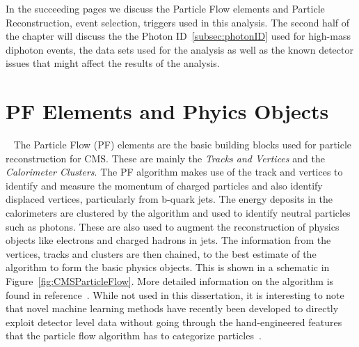 In the succeeding pages we discuss the Particle Flow elements and Particle Reconstruction, event selection, triggers used in this analysis. The second half of the chapter will discuss the the Photon ID~\ref{subsec:photonID} used for high-mass diphoton events, the data sets used for the analysis as well as the known detector issues that might affect the results of the analysis. 


\section{PF Elements and Phyics Objects}~\label{sec:PFelements}
The Particle Flow (PF) elements are the basic building blocks used for particle reconstruction for CMS. These are mainly the \textit{Tracks and Vertices} and the \textit{Calorimeter Clusters}. The PF algorithm makes use of the track and vertices to identify and measure the momentum of charged particles and also identify displaced vertices, particularly from b-quark jets. The energy deposits in the calorimeters are clustered by the algorithm and used to identify neutral particles such as photons. These are also used to augment the reconstruction of physics objects like electrons and charged hadrons in jets. The information from the vertices, tracks and clusters are then chained, to the best estimate of the algorithm to form the basic physics objects. This is shown in a schematic in Figure~\ref{fig:CMSParticleFlow}. More detailed information on the algorithm is found in reference~\cite{CMS-PRF-14-001}. While not used in this dissertation, it is interesting to note that novel machine learning methods have recently been developed to directly exploit detector level data without going through the hand-engineered features that the particle flow algorithm has to categorize particles~\cite{Andrews_2020_e22_jet, Andrews_2020_e2e_direct}.


